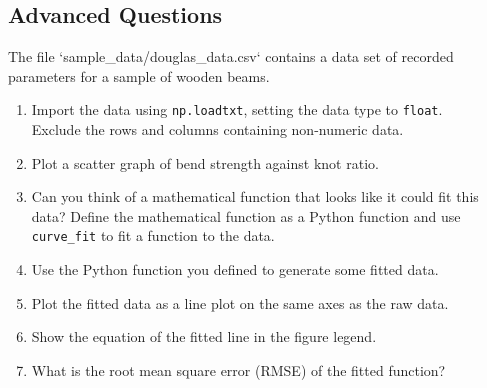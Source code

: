 \documentclass[11pt]{report}
\begin{document}
\begin{Exercise}[title= Polynomials] \label{Ex:Variables}
\end{Exercise}

\subsection*{Advanced Questions}

The file `sample\_data/douglas\_data.csv` contains a data set of recorded parameters for a sample of wooden beams.

\begin{enumerate}
    \item Import the data using {\tt np.loadtxt}, setting the data type to {\tt float}. \\
          Exclude the rows and columns containing non-numeric data.
    \item Plot a scatter graph of bend strength against knot ratio. 
    \item Can you think of a mathematical function that looks like it could fit this data? Define the mathematical function as a Python function and use {\tt curve\_fit} to fit a function to the data. 
    \item Use the Python function you defined to generate some fitted data. 
    \item Plot the fitted data as a line plot on the same axes as the raw data.
    \item Show the equation of the fitted line in the figure legend.
    \item What is the root mean square error (RMSE) of the fitted function? 
\end{enumerate}
\end{document}
